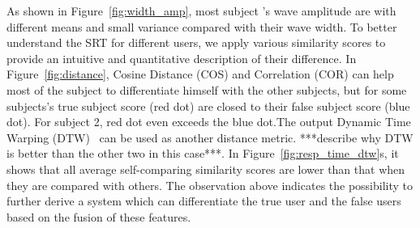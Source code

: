As shown in Figure~\ref{fig:width_amp}, most subject ’s wave amplitude are with different means and small variance compared with their wave width.  To better understand the SRT for different users,  we apply various similarity scores to provide an intuitive and quantitative description of their difference. In Figure~\ref{fig:distance}, Cosine Distance (COS) and Correlation (COR) can help most of the subject to differentiate himself with the other subjects, but for some subjects's true subject score (red dot) are closed to their false subject score (blue dot). For subject 2, red dot even exceeds the blue dot.The output Dynamic Time Warping (DTW)~\cite{cite dtw} can be used as another distance metric. ***describe why DTW is better than the other two in this case***. In Figure~\ref{fig:resp_time_dtw}s,  it shows that all average self-comparing similarity scores are lower than that when they are compared with others. The observation above indicates the possibility to further derive a system which can differentiate the true user and the false users based on the fusion of these features.